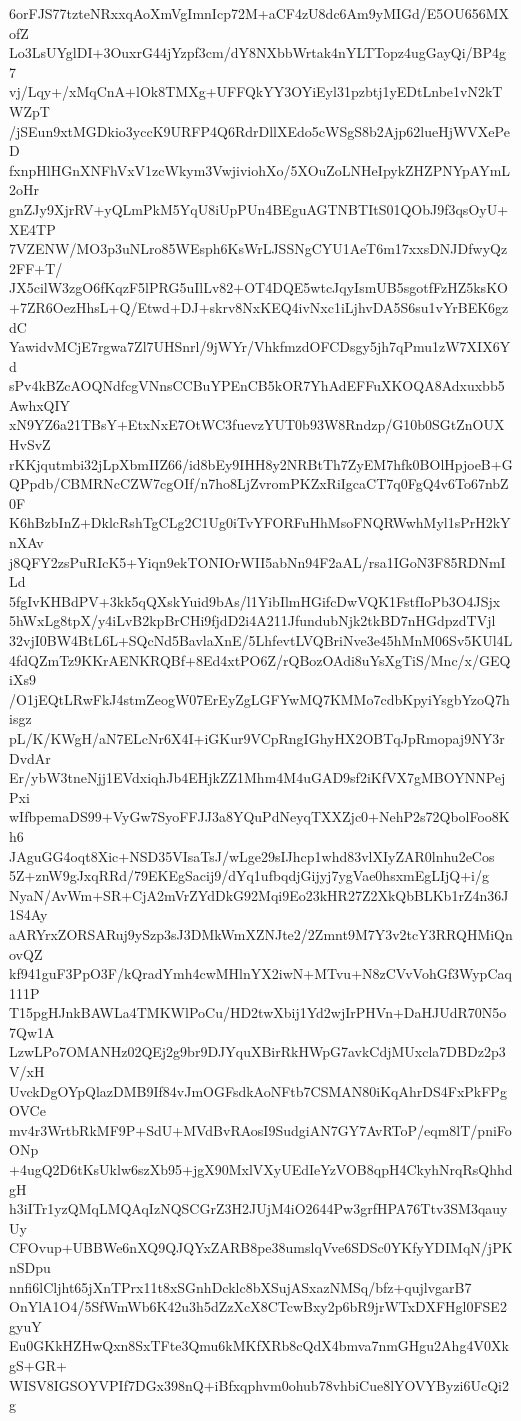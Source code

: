 6orFJS77tzteNRxxqAoXmVgImnIcp72M+aCF4zU8dc6Am9yMIGd/E5OU656MXofZ
Lo3LsUYglDI+3OuxrG44jYzpf3cm/dY8NXbbWrtak4nYLTTopz4ugGayQi/BP4g7
vj/Lqy+/xMqCnA+lOk8TMXg+UFFQkYY3OYiEyl31pzbtj1yEDtLnbe1vN2kTWZpT
/jSEun9xtMGDkio3yccK9URFP4Q6RdrDllXEdo5cWSgS8b2Ajp62lueHjWVXePeD
fxnpHlHGnXNFhVxV1zcWkym3VwjiviohXo/5XOuZoLNHeIpykZHZPNYpAYmL2oHr
gnZJy9XjrRV+yQLmPkM5YqU8iUpPUn4BEguAGTNBTItS01QObJ9f3qsOyU+XE4TP
7VZENW/MO3p3uNLro85WEsph6KsWrLJSSNgCYU1AeT6m17xxsDNJDfwyQz2FF+T/
JX5cilW3zgO6fKqzF5lPRG5uIlLv82+OT4DQE5wtcJqyIsmUB5sgotfFzHZ5ksKO
+7ZR6OezHhsL+Q/Etwd+DJ+skrv8NxKEQ4ivNxc1iLjhvDA5S6su1vYrBEK6gzdC
YawidvMCjE7rgwa7Zl7UHSnrl/9jWYr/VhkfmzdOFCDsgy5jh7qPmu1zW7XIX6Yd
sPv4kBZcAOQNdfcgVNnsCCBuYPEnCB5kOR7YhAdEFFuXKOQA8Adxuxbb5AwhxQIY
xN9YZ6a21TBsY+EtxNxE7OtWC3fuevzYUT0b93W8Rndzp/G10b0SGtZnOUXHvSvZ
rKKjqutmbi32jLpXbmIIZ66/id8bEy9IHH8y2NRBtTh7ZyEM7hfk0BOlHpjoeB+G
QPpdb/CBMRNcCZW7cgOIf/n7ho8LjZvromPKZxRiIgcaCT7q0FgQ4v6To67nbZ0F
K6hBzbInZ+DklcRshTgCLg2C1Ug0iTvYFORFuHhMsoFNQRWwhMyl1sPrH2kYnXAv
j8QFY2zsPuRIcK5+Yiqn9ekTONIOrWII5abNn94F2aAL/rsa1IGoN3F85RDNmILd
5fgIvKHBdPV+3kk5qQXskYuid9bAs/l1YibIlmHGifcDwVQK1FstfIoPb3O4JSjx
5hWxLg8tpX/y4iLvB2kpBrCHi9fjdD2i4A211JfundubNjk2tkBD7nHGdpzdTVjl
32vjI0BW4BtL6L+SQcNd5BavlaXnE/5LhfevtLVQBriNve3e45hMnM06Sv5KUl4L
4fdQZmTz9KKrAENKRQBf+8Ed4xtPO6Z/rQBozOAdi8uYsXgTiS/Mnc/x/GEQiXs9
/O1jEQtLRwFkJ4stmZeogW07ErEyZgLGFYwMQ7KMMo7cdbKpyiYsgbYzoQ7hisgz
pL/K/KWgH/aN7ELcNr6X4I+iGKur9VCpRngIGhyHX2OBTqJpRmopaj9NY3rDvdAr
Er/ybW3tneNjj1EVdxiqhJb4EHjkZZ1Mhm4M4uGAD9sf2iKfVX7gMBOYNNPejPxi
wIfbpemaDS99+VyGw7SyoFFJJ3a8YQuPdNeyqTXXZjc0+NehP2s72QbolFoo8Kh6
JAguGG4oqt8Xic+NSD35VIsaTsJ/wLge29sIJhcp1whd83vlXIyZAR0lnhu2eCos
5Z+znW9gJxqRRd/79EKEgSacij9/dYq1ufbqdjGijyj7ygVae0hsxmEgLIjQ+i/g
NyaN/AvWm+SR+CjA2mVrZYdDkG92Mqi9Eo23kHR27Z2XkQbBLKb1rZ4n36J1S4Ay
aARYrxZORSARuj9ySzp3sJ3DMkWmXZNJte2/2Zmnt9M7Y3v2tcY3RRQHMiQnovQZ
kf941guF3PpO3F/kQradYmh4cwMHlnYX2iwN+MTvu+N8zCVvVohGf3WypCaq111P
T15pgHJnkBAWLa4TMKWlPoCu/HD2twXbij1Yd2wjIrPHVn+DaHJUdR70N5o7Qw1A
LzwLPo7OMANHz02QEj2g9br9DJYquXBirRkHWpG7avkCdjMUxcla7DBDz2p3V/xH
UvckDgOYpQlazDMB9If84vJmOGFsdkAoNFtb7CSMAN80iKqAhrDS4FxPkFPgOVCe
mv4r3WrtbRkMF9P+SdU+MVdBvRAosI9SudgiAN7GY7AvRToP/eqm8lT/pniFoONp
+4ugQ2D6tKsUklw6szXb95+jgX90MxlVXyUEdIeYzVOB8qpH4CkyhNrqRsQhhdgH
h3iITr1yzQMqLMQAqIzNQSCGrZ3H2JUjM4iO2644Pw3grfHPA76Ttv3SM3qauyUy
CFOvup+UBBWe6nXQ9QJQYxZARB8pe38umslqVve6SDSc0YKfyYDIMqN/jPKnSDpu
nnfi6lCljht65jXnTPrx11t8xSGnhDcklc8bXSujASxazNMSq/bfz+qujlvgarB7
OnYlA1O4/5SfWmWb6K42u3h5dZzXcX8CTcwBxy2p6bR9jrWTxDXFHgl0FSE2gyuY
Eu0GKkHZHwQxn8SxTFte3Qmu6kMKfXRb8cQdX4bmva7nmGHgu2Ahg4V0XkgS+GR+
WISV8IGSOYVPIf7DGx398nQ+iBfxqphvm0ohub78vhbiCue8lYOVYByzi6UcQi2g
